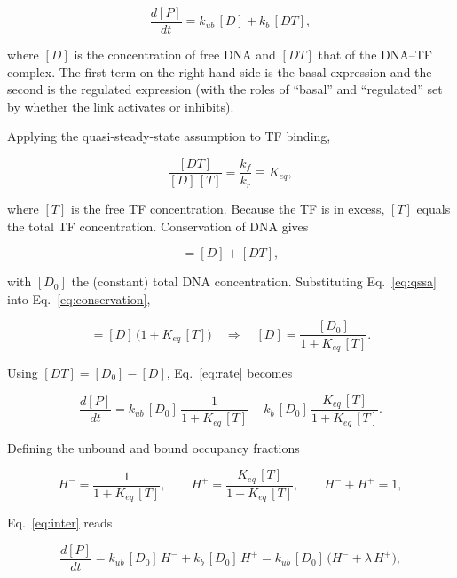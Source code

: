 \documentclass[11pt]{article}
\begin{document}
\begin{equation}
    \frac{d[P]}{dt} = k_{ub}\,[D] + k_{b}\,[DT],
    \label{eq:rate}
\end{equation}

where $[D]$ is the concentration of free DNA and $[DT]$ that of the DNA--TF
complex. The first term on the right-hand side is the basal expression and the
second is the regulated expression (with the roles of ``basal'' and
``regulated'' set by whether the link activates or inhibits).

Applying the quasi-steady-state assumption to TF binding,

\begin{equation}
    \frac{[DT]}{[D]\,[T]} = \frac{k_f}{k_r} \equiv K_{eq},
    \label{eq:qssa}
\end{equation}

where $[T]$ is the free TF concentration. Because the TF is in excess,
$[T]$ equals the total TF concentration. Conservation of DNA gives

\begin{equation}
    [D_0] = [D] + [DT],
    \label{eq:conservation}
\end{equation}

with $[D_0]$ the (constant) total DNA concentration. Substituting
Eq.~\eqref{eq:qssa} into Eq.~\eqref{eq:conservation},

\begin{equation}
    [D_0] = [D]\,\bigl(1 + K_{eq}\,[T]\bigr)
    \quad\Longrightarrow\quad
    [D] = \frac{[D_0]}{1 + K_{eq}\,[T]}.
    \label{eq:freeDNA}
\end{equation}

Using $[DT] = [D_0] - [D]$, Eq.~\eqref{eq:rate} becomes

\begin{equation}
    \frac{d[P]}{dt}
    = k_{ub}\,[D_0]\,\frac{1}{1 + K_{eq}\,[T]}
    + k_{b}\,[D_0]\,\frac{K_{eq}\,[T]}{1 + K_{eq}\,[T]}.
    \label{eq:inter}
\end{equation}

Defining the unbound and bound occupancy fractions

\begin{equation}
    H^{-} = \frac{1}{1 + K_{eq}\,[T]},
    \qquad
    H^{+} = \frac{K_{eq}\,[T]}{1 + K_{eq}\,[T]},
    \qquad H^{-} + H^{+} = 1,
    \label{eq:Hpm}
\end{equation}

Eq.~\eqref{eq:inter} reads

\begin{equation}
    \frac{d[P]}{dt}
    = k_{ub}\,[D_0]\,H^{-} + k_{b}\,[D_0]\,H^{+}
    = k_{ub}\,[D_0]\,\bigl(H^{-} + \lambda\,H^{+}\bigr),
    \label{eq:preNorm}
\end{equation}
\end{document}
